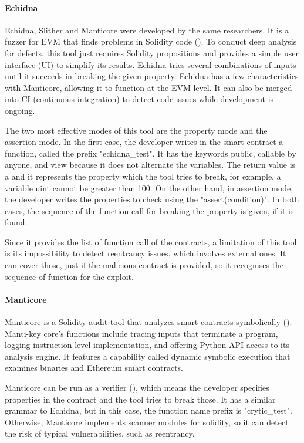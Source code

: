 \documentclass[a4paper,sigconf, language=french,
language=german, language=spanish, language=english]{acmart}
\begin{document}
\paragraph{Echidna} 
Echidna, Slither and Manticore were developed by the same researchers.
It is a fuzzer for EVM that finds problems in Solidity code (\cite{Echidna}).
To conduct deep analysis for defects, this tool just requires Solidity propositions and provides a simple user interface (UI) to simplify its results.
Echidna tries several combinations of inputs until it succeeds in breaking the given property.
Echidna has a few characteristics with Manticore, allowing it to function at the EVM level.
It can also be merged into CI (continuous integration) to detect code issues while development is ongoing. 

The two most effective modes of this tool are the property mode and the assertion mode. In the first case, the developer writes in the smart contract a function, called the prefix "echidna\_test". It has the keywords public, callable by anyone, and view because it does not alternate the variables. The return value is a  and it represents the property which the tool tries to break, for example, a variable uint cannot be greater than 100. On the other hand, in assertion mode, the developer writes the properties to check using the "assert(condition)". In both cases, the sequence of the function call for breaking the property is given, if it is found.

Since it provides the list of function call of the contracts, a limitation of this tool is its impossibility to detect reentrancy issues, which involves external ones. It can cover those, just if the malicious contract is provided, so it recognises the sequence of function for the exploit.

\paragraph{Manticore} 
Manticore is a Solidity audit tool that analyzes smart contracts symbolically (\cite{Manticore}).
Manti-key core's functions include tracing inputs that terminate a program, logging instruction-level implementation, and offering Python API access to its analysis engine.
It features a capability called dynamic symbolic execution that examines binaries and Ethereum smart contracts.

Manticore can be run as a verifier (\cite{ManticoreVerifier}), which means the developer specifies properties in the contract and the tool tries to break those. It has a similar grammar to Echidna, but in this case, the function name prefix is "crytic\_test". Otherwise, Manticore implements scanner modules for solidity, so it can detect the risk of typical vulnerabilities, such as reentrancy.
\end{document}
